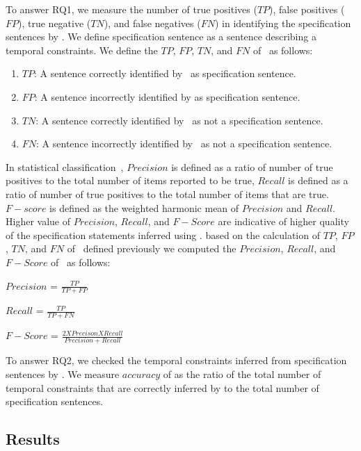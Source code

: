  


To answer RQ1, we measure the number of true positives ($TP$), false positives ($FP$), true negative ($TN$), and false negatives ($FN$)
in identifying the specification sentences by \tool.
We define specification sentence as a sentence describing a temporal constraints.
We define the $TP$, $FP$, $TN$, and $FN$ of \tool\ as follows:

\begin{enumerate}
	\item $TP$: A sentence correctly identified by \tool\ as specification sentence.
	\item $FP$: A sentence incorrectly identified by \tool as specification sentence.
	\item $TN$: A sentence correctly identified by \tool\ as not a specification sentence.
	\item $FN$: A sentence incorrectly identified by \tool\ as not a specification sentence.
\end{enumerate}


In statistical classification~\cite{Olson08}, $Precision$ is defined as a ratio of
number of true positives to the total number of items reported to be true,
$Recall$ is defined as a ratio of number of true positives to the total number
of items that are true. $F-score$ is defined as the weighted harmonic mean of 
$Precision$ and $Recall$. Higher value of $Precision$, $Recall$, and $F-Score$
are indicative of higher quality of the specification statements inferred using 
\tool. based on the calculation of $TP$, $FP$, $TN$, and $FN$ of \tool\ defined
previously we computed the $Precision$, $Recall$, and $F-Score$ of \tool\ as follows:


\begin{center}

$Precision$ = $\frac{TP}{TP + FP}$

$Recall$ = $\frac{TP}{TP + FN}$

$F-Score$ = $\frac{2 X Precison X Recall}{Precision + Recall}$

\end{center}

To answer RQ2, we checked the temporal constraints inferred from specification sentences by \tool.
We measure $accuracy$ of \tool as the ratio of the total number of temporal constraints that
are correctly inferred by \tool to the total number of specification sentences. 

\subsection{Results}

